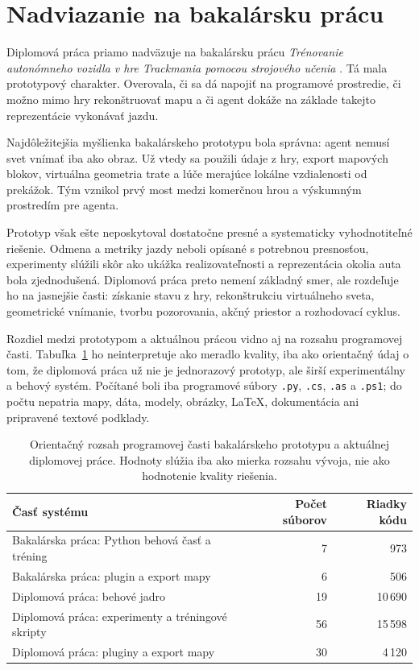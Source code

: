 \section{Nadviazanie na bakalársku prácu}

Diplomová práca priamo nadväzuje na bakalársku prácu \emph{Trénovanie autonómneho vozidla v hre Trackmania pomocou strojového učenia} \cite{melkovic2024bachelor}. Tá mala prototypový charakter. Overovala, či sa dá \Trackmania{} napojiť na programové prostredie, či možno mimo hry rekonštruovať mapu a či agent dokáže na základe takejto reprezentácie vykonávať jazdu.

Najdôležitejšia myšlienka bakalárskeho prototypu bola správna: agent nemusí svet vnímať iba ako obraz. Už vtedy sa použili údaje z hry, export mapových blokov, virtuálna geometria trate a lúče merajúce lokálne vzdialenosti od prekážok. Tým vznikol prvý most medzi komerčnou hrou a výskumným prostredím pre agenta.

Prototyp však ešte neposkytoval dostatočne presné a systematicky vyhodnotiteľné riešenie. Odmena a metriky jazdy neboli opísané s potrebnou presnosťou, experimenty slúžili skôr ako ukážka realizovateľnosti a reprezentácia okolia auta bola zjednodušená. Diplomová práca preto nemení základný smer, ale rozdeľuje ho na jasnejšie časti: získanie stavu z hry, rekonštrukciu virtuálneho sveta, geometrické vnímanie, tvorbu pozorovania, akčný priestor a rozhodovací cyklus.

Rozdiel medzi prototypom a aktuálnou prácou vidno aj na rozsahu programovej časti. Tabuľka~\ref{tab:code_scope_bc_vs_diploma} ho neinterpretuje ako meradlo kvality, iba ako orientačný údaj o tom, že diplomová práca už nie je jednorazový prototyp, ale širší experimentálny a behový systém. Počítané boli iba programové súbory \texttt{.py}, \texttt{.cs}, \texttt{.as} a \texttt{.ps1}; do počtu nepatria mapy, dáta, modely, obrázky, LaTeX, dokumentácia ani pripravené textové podklady.

\begin{table}[htbp]
    \centering
    \small
    \setlength{\tabcolsep}{5pt}
    \renewcommand{\arraystretch}{1.15}
    \caption[Orientačný rozsah programovej časti]{Orientačný rozsah programovej časti bakalárskeho prototypu a aktuálnej diplomovej práce. Hodnoty slúžia iba ako mierka rozsahu vývoja, nie ako hodnotenie kvality riešenia.}
    \label{tab:code_scope_bc_vs_diploma}
    \begin{tabular}{lrr}
        \toprule
        Časť systému & Počet súborov & Riadky kódu \\
        \midrule
        Bakalárska práca: Python behová časť a tréning & 7 & 973 \\
        Bakalárska práca: plugin a export mapy & 6 & 506 \\
        \midrule
        Diplomová práca: behové jadro & 19 & 10\,690 \\
        Diplomová práca: experimenty a tréningové skripty & 56 & 15\,598 \\
        Diplomová práca: pluginy a export mapy & 30 & 4\,120 \\
        \bottomrule
    \end{tabular}
\end{table}

